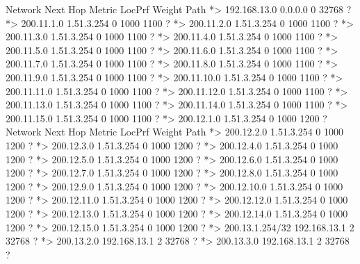 \documentclass[10pt]{article}
\begin{document}
\begin{itemize}
\begin{verbatim*}
		   Network          Next Hop            Metric LocPrf Weight Path
		*> 192.168.13.0     0.0.0.0                  0         32768 ?
		*> 200.11.1.0       1.51.3.254                             0 1000 1100 ?
		*> 200.11.2.0       1.51.3.254                             0 1000 1100 ?
		*> 200.11.3.0       1.51.3.254                             0 1000 1100 ?
		*> 200.11.4.0       1.51.3.254                             0 1000 1100 ?
		*> 200.11.5.0       1.51.3.254                             0 1000 1100 ?
		*> 200.11.6.0       1.51.3.254                             0 1000 1100 ?
		*> 200.11.7.0       1.51.3.254                             0 1000 1100 ?
		*> 200.11.8.0       1.51.3.254                             0 1000 1100 ?
		*> 200.11.9.0       1.51.3.254                             0 1000 1100 ?
		*> 200.11.10.0      1.51.3.254                             0 1000 1100 ?
		*> 200.11.11.0      1.51.3.254                             0 1000 1100 ?
		*> 200.11.12.0      1.51.3.254                             0 1000 1100 ?
		*> 200.11.13.0      1.51.3.254                             0 1000 1100 ?
		*> 200.11.14.0      1.51.3.254                             0 1000 1100 ?
		*> 200.11.15.0      1.51.3.254                             0 1000 1100 ?
		*> 200.12.1.0       1.51.3.254                             0 1000 1200 ?
		   Network          Next Hop            Metric LocPrf Weight Path
		*> 200.12.2.0       1.51.3.254                             0 1000 1200 ?
		*> 200.12.3.0       1.51.3.254                             0 1000 1200 ?
		*> 200.12.4.0       1.51.3.254                             0 1000 1200 ?
		*> 200.12.5.0       1.51.3.254                             0 1000 1200 ?
		*> 200.12.6.0       1.51.3.254                             0 1000 1200 ?
		*> 200.12.7.0       1.51.3.254                             0 1000 1200 ?
		*> 200.12.8.0       1.51.3.254                             0 1000 1200 ?
		*> 200.12.9.0       1.51.3.254                             0 1000 1200 ?
		*> 200.12.10.0      1.51.3.254                             0 1000 1200 ?
		*> 200.12.11.0      1.51.3.254                             0 1000 1200 ?
		*> 200.12.12.0      1.51.3.254                             0 1000 1200 ?
		*> 200.12.13.0      1.51.3.254                             0 1000 1200 ?
		*> 200.12.14.0      1.51.3.254                             0 1000 1200 ?
		*> 200.12.15.0      1.51.3.254                             0 1000 1200 ?
		*> 200.13.1.254/32  192.168.13.1             2         32768 ?
		*> 200.13.2.0       192.168.13.1             2         32768 ?
		*> 200.13.3.0       192.168.13.1             2         32768 ?

\end{verbatim*}
\end{itemize}
\end{document}
